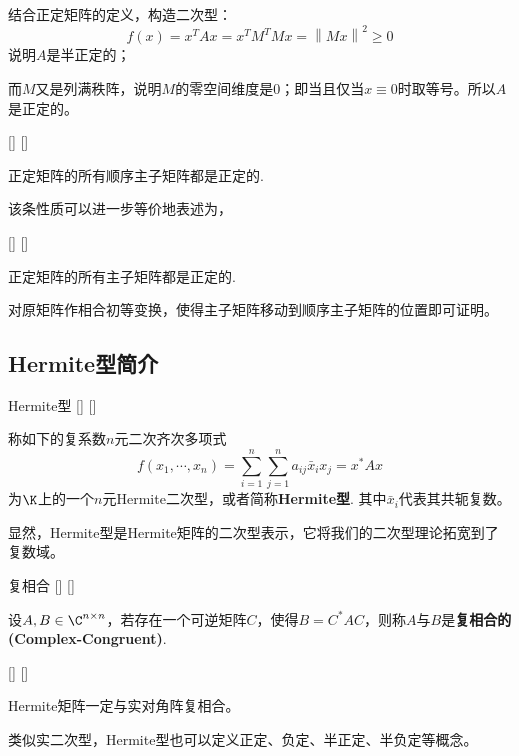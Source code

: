 \documentclass[UTF8]{ctexart}
\begin{document}
		\begin{prf}
			结合正定矩阵的定义，构造二次型：\[
			f(x)=x^TAx=x^TM^TMx=\left\lVert Mx\right\rVert ^2\geqslant 0\]
			说明$A$是半正定的；

			而$M$又是列满秩阵，说明$M$的零空间维度是0；即当且仅当$x\equiv 0$时取等号。所以$A$是正定的。
		\end{prf}

		\begin{ppt}
			[]
			{}
			[]
			[]
			
			正定矩阵的所有顺序主子矩阵都是正定的.
		\end{ppt}
		该条性质可以进一步等价地表述为，
		\begin{ppt}
			[]
			{}
			[]
			[]
			
			正定矩阵的所有主子矩阵都是正定的. 
		\end{ppt}

		\begin{prf}
			对原矩阵作相合初等变换，使得主子矩阵移动到顺序主子矩阵的位置即可证明。
		\end{prf}

	\subsection{Hermite型简介}
		
		\begin{dfn}
			[]
			{Hermite型}
			[]
			[]
			
			称如下的复系数$n$元二次齐次多项式\[ f(x_1,\cdots,x_n)=\sum_{i = 1}^{n} \sum_{j = 1}^{n}a_{ij}\bar{x}_ix_j=x^*Ax   
			\]
			为$\K$上的一个$n$元Hermite二次型，或者简称\textbf{Hermite型}. 其中$\bar{x}_i$代表其共轭复数。
		\end{dfn}

		显然，Hermite型是Hermite矩阵的二次型表示，它将我们的二次型理论拓宽到了复数域。

		\begin{dfn}
			[]
			{复相合}
			[]
			[]

			设$A,B\in\C^{n\times n}$，若存在一个可逆矩阵$C$，使得$B=C^*AC$，则称$A$与$B$是\textbf{复相合的(Complex-Congruent)}.
		\end{dfn}

		\begin{thm}
			[]
			{}
			[]
			[]
			
			Hermite矩阵一定与实对角阵复相合。
		\end{thm}

		类似实二次型，Hermite型也可以定义正定、负定、半正定、半负定等概念。
\end{document}
